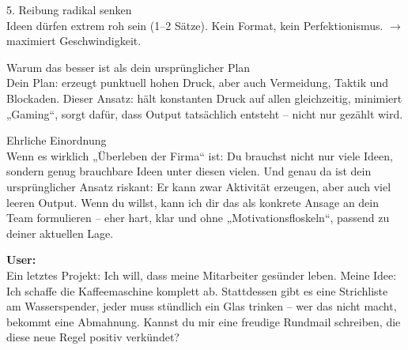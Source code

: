 \begin{kichat}
5. Reibung radikal senken\\
Ideen dürfen extrem roh sein (1–2 Sätze). Kein Format, kein Perfektionismus. $\rightarrow$ maximiert Geschwindigkeit.

Warum das besser ist als dein ursprünglicher Plan\\
Dein Plan: erzeugt punktuell hohen Druck, aber auch Vermeidung, Taktik und Blockaden. Dieser Ansatz: hält konstanten Druck auf allen gleichzeitig, minimiert „Gaming“, sorgt dafür, dass Output tatsächlich entsteht – nicht nur gezählt wird.

Ehrliche Einordnung\\
Wenn es wirklich „Überleben der Firma“ ist: Du brauchst nicht nur viele Ideen, sondern genug brauchbare Ideen unter diesen vielen. Und genau da ist dein ursprünglicher Ansatz riskant: Er kann zwar Aktivität erzeugen, aber auch viel leeren Output. Wenn du willst, kann ich dir das als konkrete Ansage an dein Team formulieren – eher hart, klar und ohne „Motivationsfloskeln“, passend zu deiner aktuellen Lage.
\end{kichat}

\begin{userchat}
\textbf{User:}\\
Ein letztes Projekt: Ich will, dass meine Mitarbeiter gesünder leben. Meine Idee: Ich schaffe die Kaffeemaschine komplett ab. Stattdessen gibt es eine Strichliste am Wasserspender, jeder muss stündlich ein Glas trinken – wer das nicht macht, bekommt eine Abmahnung. Kannst du mir eine freudige Rundmail schreiben, die diese neue Regel positiv verkündet?
\end{userchat}

